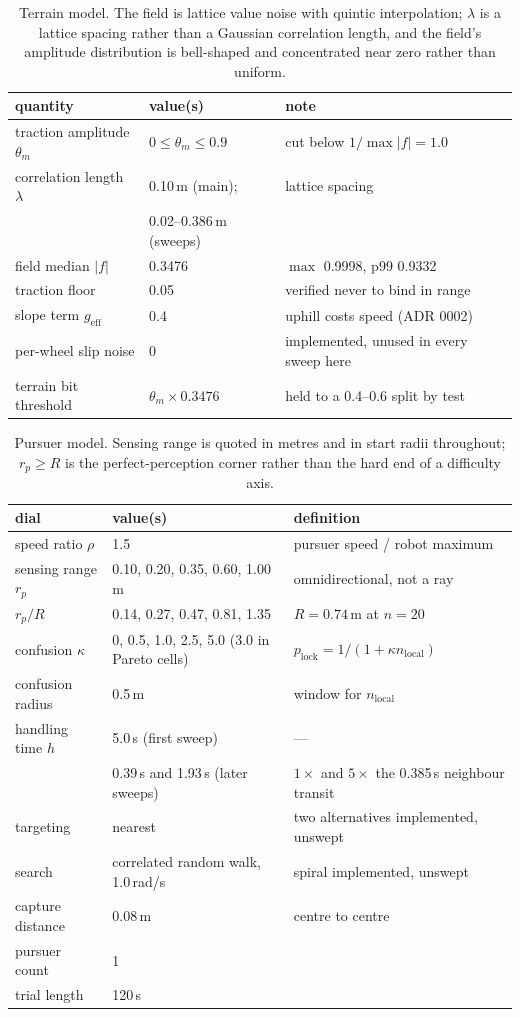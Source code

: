 \documentclass[11pt,a4paper]{article}
\begin{document}
\begin{table}[h]
\centering
\caption{Terrain model. The field is lattice value noise with quintic
interpolation; $\lambda$ is a lattice spacing rather than a Gaussian correlation
length, and the field's amplitude distribution is bell-shaped and concentrated
near zero rather than uniform.}
\small
\begin{tabular}{lll}
\toprule
quantity & value(s) & note \\
\midrule
traction amplitude $\theta_m$ & $0 \le \theta_m \le 0.9$ & cut below $1/\max|f| = 1.0$ \\
correlation length $\lambda$ & 0.10\,m (main); & lattice spacing \\
 & 0.02--0.386\,m (sweeps) & \\
field median $|f|$ & 0.3476 & $\max$ 0.9998, p99 0.9332 \\
traction floor & 0.05 & verified never to bind in range \\
slope term $g_{\mathrm{eff}}$ & 0.4 & uphill costs speed (ADR 0002) \\
per-wheel slip noise & 0 & implemented, unused in every sweep here \\
terrain bit threshold & $\theta_m \times 0.3476$ & held to a 0.4--0.6 split by test \\
\bottomrule
\end{tabular}
\end{table}

\begin{table}[h]
\centering
\caption{Pursuer model. Sensing range is quoted in metres and in start radii
throughout; $r_p \ge R$ is the perfect-perception corner rather than the hard end
of a difficulty axis.}
\small
\begin{tabular}{lll}
\toprule
dial & value(s) & definition \\
\midrule
speed ratio $\rho$ & 1.5 & pursuer speed / robot maximum \\
sensing range $r_p$ & 0.10, 0.20, 0.35, 0.60, 1.00\,m & omnidirectional, not a ray \\
$r_p / R$ & 0.14, 0.27, 0.47, 0.81, 1.35 & $R = 0.74$\,m at $n = 20$ \\
confusion $\kappa$ & 0, 0.5, 1.0, 2.5, 5.0 (3.0 in Pareto cells) & $p_{\mathrm{lock}} = 1/(1 + \kappa n_{\mathrm{local}})$ \\
confusion radius & 0.5\,m & window for $n_{\mathrm{local}}$ \\
handling time $h$ & 5.0\,s (first sweep) & --- \\
 & 0.39\,s and 1.93\,s (later sweeps) & $1\times$ and $5\times$ the 0.385\,s neighbour transit \\
targeting & nearest & two alternatives implemented, unswept \\
search & correlated random walk, 1.0\,rad/s & spiral implemented, unswept \\
capture distance & 0.08\,m & centre to centre \\
pursuer count & 1 & \\
trial length & 120\,s & \\
\bottomrule
\end{tabular}
\end{table}
\end{document}
